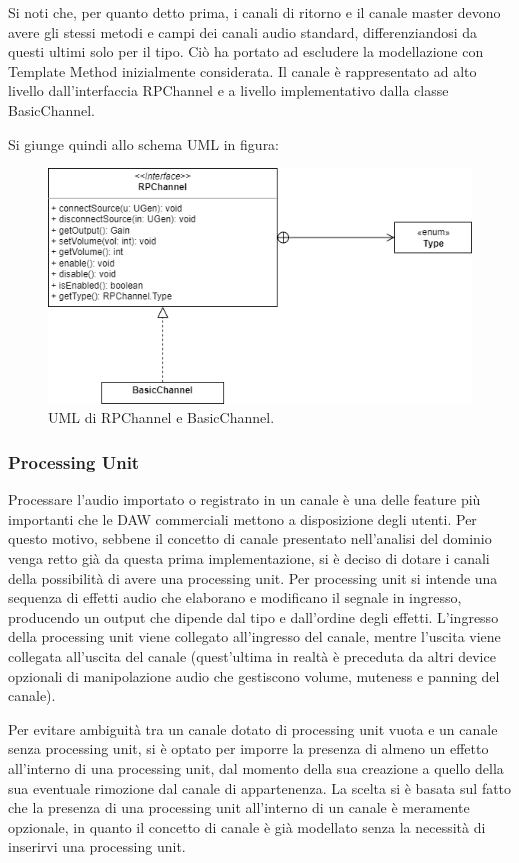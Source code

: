 \documentclass[a4paper,12pt]{report}
\begin{document}
Si noti che, per quanto detto prima, i canali di ritorno e il canale master devono avere gli stessi metodi e campi dei canali audio standard, differenziandosi da questi ultimi solo per il tipo. Ciò ha portato ad escludere la modellazione con Template Method inizialmente considerata. Il canale è rappresentato ad alto livello dall’interfaccia RPChannel e a livello implementativo dalla classe BasicChannel. 

Si giunge quindi allo schema UML in figura:
\endsubsubsection

\begin{figure}[H]
\centering{}
\includegraphics[width=\textwidth,scale=1]{img/channel.png}
\caption{UML di RPChannel e BasicChannel.}
\end{figure}

\subsubsection{Processing Unit}
Processare l’audio importato o registrato in un canale è una delle feature più importanti che le DAW commerciali mettono a disposizione degli utenti. Per questo motivo, sebbene il concetto di canale presentato nell’analisi del dominio venga retto già da questa prima implementazione, si è deciso di dotare i canali della possibilità di avere una processing unit. Per processing unit si intende una sequenza di effetti audio che elaborano e modificano il segnale in ingresso, producendo un output che dipende dal tipo e dall’ordine degli effetti. 
L’ingresso della processing unit viene collegato all’ingresso del canale, mentre l’uscita viene collegata all’uscita del canale (quest’ultima in realtà è preceduta da altri device opzionali di manipolazione audio che gestiscono volume, muteness e panning del canale).

Per evitare ambiguità tra un canale dotato di processing unit vuota e un canale senza processing unit, si è optato per imporre la presenza di almeno un effetto all’interno di una processing unit, dal momento della sua creazione a quello della sua eventuale rimozione dal canale di appartenenza.
La scelta si è basata sul fatto che la presenza di una processing unit all’interno di un canale è meramente opzionale, in quanto il concetto di canale è già modellato senza la necessità di inserirvi una processing unit.
\end{document}
